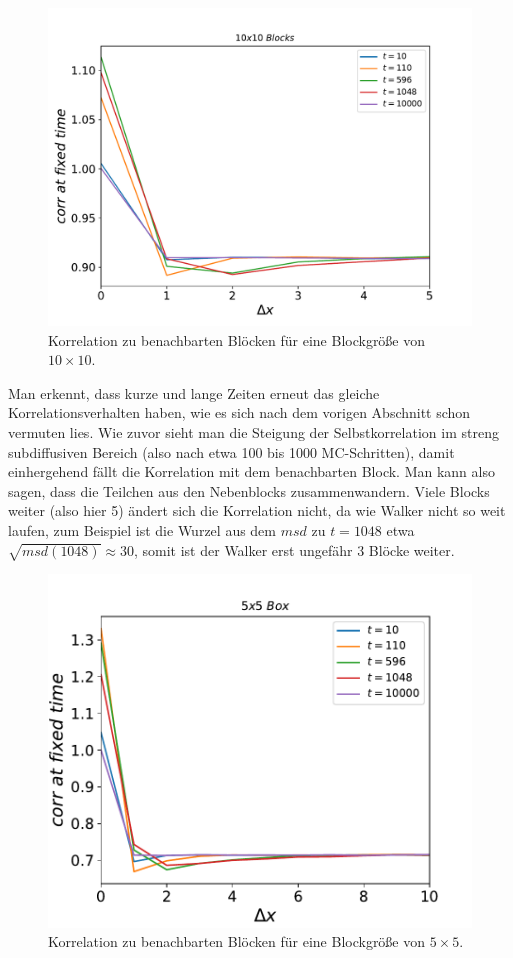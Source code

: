 \documentclass[a4paper, 12pt]{scrartcl}
\begin{document}
\begin{figure}[h!]
	\centering
	\includegraphics[scale=0.8]{corr10.pdf}
	\caption{Korrelation zu benachbarten Blöcken für eine Blockgröße von $10\times 10$.}
\end{figure}

\noindent Man erkennt, dass kurze und lange Zeiten erneut das gleiche Korrelationsverhalten haben, wie es sich nach dem vorigen Abschnitt schon vermuten lies. Wie zuvor sieht man die Steigung der Selbstkorrelation im streng subdiffusiven Bereich (also nach etwa 100 bis 1000 MC-Schritten), damit einhergehend fällt die Korrelation mit dem benachbarten Block. Man kann also sagen, dass die Teilchen aus den Nebenblocks zusammenwandern. Viele Blocks weiter (also hier 5) ändert sich die Korrelation nicht, da wie Walker nicht so weit laufen, zum Beispiel ist die Wurzel aus dem $msd$ zu $t=1048$ etwa $\sqrt{msd(1048)} \approx 30$, somit ist der Walker erst ungefähr 3 Blöcke weiter. 


\begin{figure}[h!]
	\centering
	\includegraphics[scale=1]{corr5.pdf}
	\caption{Korrelation zu benachbarten Blöcken für eine Blockgröße von $5\times 5$.}
\end{figure}
\end{document}
